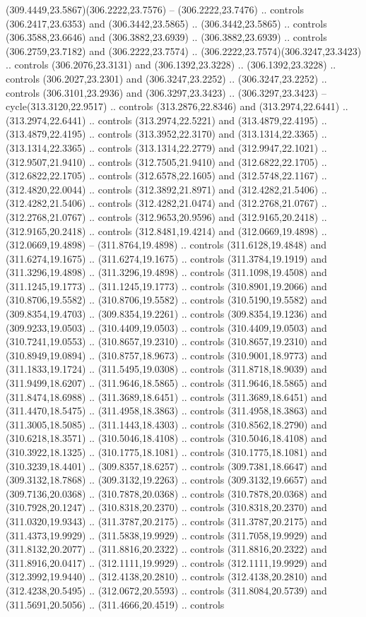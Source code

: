 (309.4449,23.5867)(306.2222,23.7576) -- (306.2222,23.7476) .. controls (306.2417,23.6353) and (306.3442,23.5865) .. (306.3442,23.5865) .. controls (306.3588,23.6646) and (306.3882,23.6939) .. (306.3882,23.6939) .. controls (306.2759,23.7182) and (306.2222,23.7574) .. (306.2222,23.7574)(306.3247,23.3423) .. controls (306.2076,23.3131) and (306.1392,23.3228) .. (306.1392,23.3228) .. controls (306.2027,23.2301) and (306.3247,23.2252) .. (306.3247,23.2252) .. controls (306.3101,23.2936) and (306.3297,23.3423) .. (306.3297,23.3423) -- cycle(313.3120,22.9517) .. controls (313.2876,22.8346) and (313.2974,22.6441) .. (313.2974,22.6441) .. controls (313.2974,22.5221) and (313.4879,22.4195) .. (313.4879,22.4195) .. controls (313.3952,22.3170) and (313.1314,22.3365) .. (313.1314,22.3365) .. controls (313.1314,22.2779) and (312.9947,22.1021) .. (312.9507,21.9410) .. controls (312.7505,21.9410) and (312.6822,22.1705) .. (312.6822,22.1705) .. controls (312.6578,22.1605) and (312.5748,22.1167) .. (312.4820,22.0044) .. controls (312.3892,21.8971) and (312.4282,21.5406) .. (312.4282,21.5406) .. controls (312.4282,21.0474) and (312.2768,21.0767) .. (312.2768,21.0767) .. controls (312.9653,20.9596) and (312.9165,20.2418) .. (312.9165,20.2418) .. controls (312.8481,19.4214) and (312.0669,19.4898) .. (312.0669,19.4898) -- (311.8764,19.4898) .. controls (311.6128,19.4848) and (311.6274,19.1675) .. (311.6274,19.1675) .. controls (311.3784,19.1919) and (311.3296,19.4898) .. (311.3296,19.4898) .. controls (311.1098,19.4508) and (311.1245,19.1773) .. (311.1245,19.1773) .. controls (310.8901,19.2066) and (310.8706,19.5582) .. (310.8706,19.5582) .. controls (310.5190,19.5582) and (309.8354,19.4703) .. (309.8354,19.2261) .. controls (309.8354,19.1236) and (309.9233,19.0503) .. (310.4409,19.0503) .. controls (310.4409,19.0503) and (310.7241,19.0553) .. (310.8657,19.2310) .. controls (310.8657,19.2310) and (310.8949,19.0894) .. (310.8757,18.9673) .. controls (310.9001,18.9773) and (311.1833,19.1724) .. (311.5495,19.0308) .. controls (311.8718,18.9039) and (311.9499,18.6207) .. (311.9646,18.5865) .. controls (311.9646,18.5865) and (311.8474,18.6988) .. (311.3689,18.6451) .. controls (311.3689,18.6451) and (311.4470,18.5475) .. (311.4958,18.3863) .. controls (311.4958,18.3863) and (311.3005,18.5085) .. (311.1443,18.4303) .. controls (310.8562,18.2790) and (310.6218,18.3571) .. (310.5046,18.4108) .. controls (310.5046,18.4108) and (310.3922,18.1325) .. (310.1775,18.1081) .. controls (310.1775,18.1081) and (310.3239,18.4401) .. (309.8357,18.6257) .. controls (309.7381,18.6647) and (309.3132,18.7868) .. (309.3132,19.2263) .. controls (309.3132,19.6657) and (309.7136,20.0368) .. (310.7878,20.0368) .. controls (310.7878,20.0368) and (310.7928,20.1247) .. (310.8318,20.2370) .. controls (310.8318,20.2370) and (311.0320,19.9343) .. (311.3787,20.2175) .. controls (311.3787,20.2175) and (311.4373,19.9929) .. (311.5838,19.9929) .. controls (311.7058,19.9929) and (311.8132,20.2077) .. (311.8816,20.2322) .. controls (311.8816,20.2322) and (311.8916,20.0417) .. (312.1111,19.9929) .. controls (312.1111,19.9929) and (312.3992,19.9440) .. (312.4138,20.2810) .. controls (312.4138,20.2810) and (312.4238,20.5495) .. (312.0672,20.5593) .. controls (311.8084,20.5739) and (311.5691,20.5056) .. (311.4666,20.4519) .. controls 